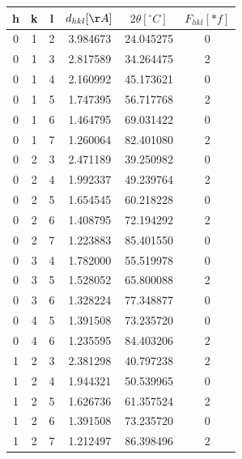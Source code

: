 \documentclass[a4paper,10pt]{article}
\begin{document}
\begin{tabular}{|cccccc|}
\hline
\hline
  h &  k &  l &  $d_{hkl}[\AA]$ &  $2\theta[^\circ C]$ &$F_{hkl}[*f]$ \\
\hline
\hline
  0 &  1 &  2 &     3.984673 &            24.045275 &            0 \\\hline
  0 &  1 &  3 &     2.817589 &            34.264475 &            2 \\\hline
  0 &  1 &  4 &     2.160992 &            45.173621 &            0 \\\hline
  0 &  1 &  5 &     1.747395 &            56.717768 &            2 \\\hline
  0 &  1 &  6 &     1.464795 &            69.031422 &            0 \\\hline
  0 &  1 &  7 &     1.260064 &            82.401080 &            2 \\\hline
  0 &  2 &  3 &     2.471189 &            39.250982 &            0 \\\hline
  0 &  2 &  4 &     1.992337 &            49.239764 &            2 \\\hline
  0 &  2 &  5 &     1.654545 &            60.218228 &            0 \\\hline
  0 &  2 &  6 &     1.408795 &            72.194292 &            2 \\\hline
  0 &  2 &  7 &     1.223883 &            85.401550 &            0 \\\hline
  0 &  3 &  4 &     1.782000 &            55.519978 &            0 \\\hline
  0 &  3 &  5 &     1.528052 &            65.800088 &            2 \\\hline
  0 &  3 &  6 &     1.328224 &            77.348877 &            0 \\\hline
  0 &  4 &  5 &     1.391508 &            73.235720 &            0 \\\hline
  0 &  4 &  6 &     1.235595 &            84.403206 &            2 \\\hline
  1 &  2 &  3 &     2.381298 &            40.797238 &            2 \\\hline
  1 &  2 &  4 &     1.944321 &            50.539965 &            0 \\\hline
  1 &  2 &  5 &     1.626736 &            61.357524 &            2 \\\hline
  1 &  2 &  6 &     1.391508 &            73.235720 &            0 \\\hline
  1 &  2 &  7 &     1.212497 &            86.398496 &            2 \\\hline

\end{tabular}
\end{document}
